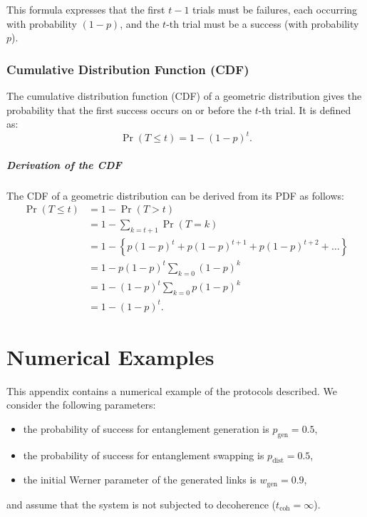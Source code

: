 \documentclass{masterthesis}
\begin{document}
This formula expresses that the first $t-1$ trials must be failures, each occurring with probability $(1-p)$, and the $t$-th trial must be a success (with probability $p$).

\subsection{Cumulative Distribution Function (CDF)}\label{subsection:geometric_cdf}

The cumulative distribution function (CDF) of a geometric distribution gives the probability that the first success occurs on or before the $t$-th trial. It is defined as:
\begin{equation}
    \Pr(T \leq t) = 1 - (1 - p)^t.
\end{equation}

\paragraph*{Derivation of the CDF}
The CDF of a geometric distribution can be derived from its PDF as follows:
\begin{align*}
    \Pr(T \leq t) &= 1 - \Pr(T > t) \\
    &= 1 - \sum_{k=t+1} \Pr(T = k) \\
    &= 1 - \left\{p (1 - p)^t + p (1 - p)^{t+1} + p (1 - p)^{t+2} + \ldots\right\} \\
    &= 1 - p (1 - p)^t \sum_{k=0} (1 - p)^k \\
    &= 1 - (1 - p)^t \sum_{k=0} p (1 - p)^k \\
    &= 1 - (1 - p)^t.
\end{align*} %

\chapter{Numerical Examples}
This appendix contains a numerical example of the protocols described. We consider the following parameters:
\begin{itemize}
    \item the probability of success for entanglement generation is $p_{\text{gen}} = 0.5$,
    \item the probability of success for entanglement swapping is $p_{\text{dist}} = 0.5$,
    \item the initial Werner parameter of the generated links is $w_{\text{gen}} = 0.9$,
\end{itemize}
and assume that the system is not subjected to decoherence ($t_\text{coh} = \infty$).
\end{document}
